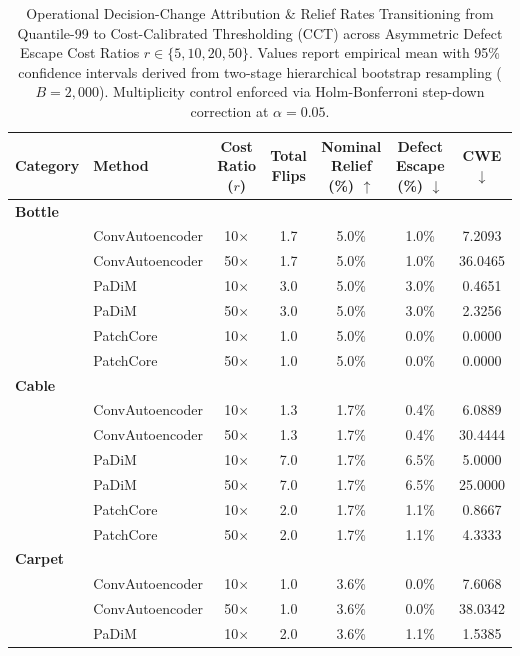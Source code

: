 \begin{table}[t]
\centering
\small
\caption{Operational Decision-Change Attribution & Relief Rates Transitioning from Quantile-99 to Cost-Calibrated Thresholding (CCT) across Asymmetric Defect Escape Cost Ratios $r \in \{5, 10, 20, 50\}$. Values report empirical mean with 95\% confidence intervals derived from two-stage hierarchical bootstrap resampling ($B = 2,000$). Multiplicity control enforced via Holm-Bonferroni step-down correction at $\alpha = 0.05$.}
\label{tab:decision_changes}
\begin{tabular}{llccccc}
\toprule
\textbf{Category} & \textbf{Method} & \textbf{Cost Ratio ($r$)} & \textbf{Total Flips} & \textbf{Nominal Relief (\%)} $\uparrow$ & \textbf{Defect Escape (\%)} $\downarrow$ & \textbf{CWE} $\downarrow$ \\
\midrule
\multicolumn{7}{l}{\textbf{Bottle}} \\
 & ConvAutoencoder & 10$\times$ & 1.7 & 5.0\% & 1.0\% & 7.2093 \\
 & ConvAutoencoder & 50$\times$ & 1.7 & 5.0\% & 1.0\% & 36.0465 \\
 & PaDiM & 10$\times$ & 3.0 & 5.0\% & 3.0\% & 0.4651 \\
 & PaDiM & 50$\times$ & 3.0 & 5.0\% & 3.0\% & 2.3256 \\
 & PatchCore & 10$\times$ & 1.0 & 5.0\% & 0.0\% & 0.0000 \\
 & PatchCore & 50$\times$ & 1.0 & 5.0\% & 0.0\% & 0.0000 \\
\midrule
\multicolumn{7}{l}{\textbf{Cable}} \\
 & ConvAutoencoder & 10$\times$ & 1.3 & 1.7\% & 0.4\% & 6.0889 \\
 & ConvAutoencoder & 50$\times$ & 1.3 & 1.7\% & 0.4\% & 30.4444 \\
 & PaDiM & 10$\times$ & 7.0 & 1.7\% & 6.5\% & 5.0000 \\
 & PaDiM & 50$\times$ & 7.0 & 1.7\% & 6.5\% & 25.0000 \\
 & PatchCore & 10$\times$ & 2.0 & 1.7\% & 1.1\% & 0.8667 \\
 & PatchCore & 50$\times$ & 2.0 & 1.7\% & 1.1\% & 4.3333 \\
\midrule
\multicolumn{7}{l}{\textbf{Carpet}} \\
 & ConvAutoencoder & 10$\times$ & 1.0 & 3.6\% & 0.0\% & 7.6068 \\
 & ConvAutoencoder & 50$\times$ & 1.0 & 3.6\% & 0.0\% & 38.0342 \\
 & PaDiM & 10$\times$ & 2.0 & 3.6\% & 1.1\% & 1.5385 \\

\end{tabular}
\end{table}
